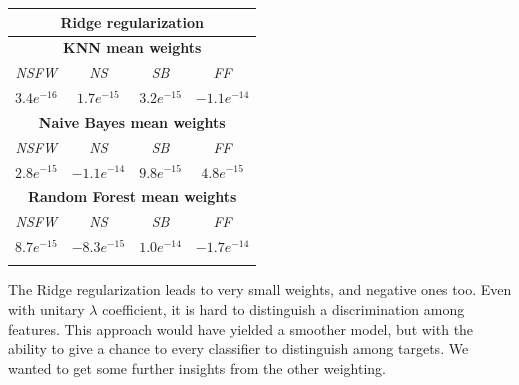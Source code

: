 \begin{center}
	\begin{tabular}{@{}cccc@{}}
		\multicolumn{4}{c}{Ridge regularization}\\
		\hline\hline
		\multicolumn{4}{c}{\textbf{KNN mean weights}}\\
		\hline
		\multicolumn{1}{c|}{\textit{NSFW}}&
		\multicolumn{1}{c|}{\textit{NS}}&
		\multicolumn{1}{c|}{\textit{SB}}&
		\multicolumn{1}{c}{\textit{FF}}\\
		\hline
		\multicolumn{1}{c|}{$ 3.4e^{-16} $}&
		\multicolumn{1}{c|}{$ 1.7e^{-15} $}&
		\multicolumn{1}{c|}{$ 3.2e^{-15} $}&
		\multicolumn{1}{c}{$ -1.1e^{-14} $}\\
		\hline
		\multicolumn{4}{c}{\textbf{Naive Bayes mean weights}}\\
		\hline
		\multicolumn{1}{c|}{\textit{NSFW}}&
		\multicolumn{1}{c|}{\textit{NS}}&
		\multicolumn{1}{c|}{\textit{SB}}&
		\multicolumn{1}{c}{\textit{FF}}\\
		\hline
		\multicolumn{1}{c|}{$ 2.8e^{-15} $}&
		\multicolumn{1}{c|}{$ -1.1e^{-14} $}&
		\multicolumn{1}{c|}{$ 9.8e^{-15} $}&
		\multicolumn{1}{c}{$ 4.8e^{-15} $}\\
		\hline
		\multicolumn{4}{c}{\textbf{Random Forest mean weights}}\\
		\hline
		\multicolumn{1}{c|}{\textit{NSFW}}&
		\multicolumn{1}{c|}{\textit{NS}}&
		\multicolumn{1}{c|}{\textit{SB}}&
		\multicolumn{1}{c}{\textit{FF}}\\
		\hline
		\multicolumn{1}{c|}{$ 8.7e^{-15} $}&
		\multicolumn{1}{c|}{$ -8.3e^{-15} $}&
		\multicolumn{1}{c|}{$ 1.0e^{-14} $}&
		\multicolumn{1}{c}{$ -1.7e^{-14} $}\\
		\hline\hline\\
	\end{tabular}
\end{center}
The Ridge regularization leads to very small weights, and negative ones too. Even with unitary $ \lambda  $ coefficient, it is hard to distinguish a discrimination among features. This approach would have yielded a smoother model, but with the ability to give a chance to every classifier to distinguish among targets.
We wanted to get some further insights from the other weighting.

